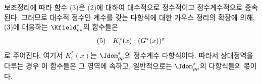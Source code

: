 
보조정리에 따라 함수 (3)은 (2)에 대하여 대수적으로 정수적이고 정수계수적으로 종속된다. 그러므로 대수적 정수인 계수를 갖는 다항식에 대한 가우스 정리의 확장에 의해, (3)에 대응하는 $\Kfield^*_{\rho\rho}$의 함수들은
\[
\begin{array}{@{}l@{\quad}c@{}}
(5)&
  K_i^*(x):(G^*(x))^\sigma
\end{array}
\]
로 주어진다. 여기서 $K_i^*(x)$는 $\Jdom^*_{\rho\rho}$의 정수계수 다항식이다. 따라서 상대정역을 다루는 경우 이 함수들은 그 영역에 속하고, 일반적으로는 $\Jdom^*_{\rho\rho}$의 다항식들의 몫이다.
